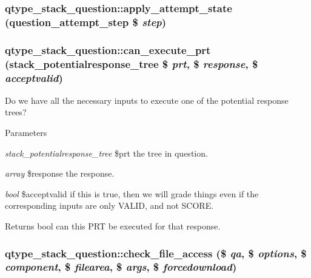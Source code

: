\hypertarget{classqtype__stack__question_a41ebd81c094de17a8cc9deaef4d06fcc}{
\subsubsection[{apply\_\-attempt\_\-state}]{\setlength{\rightskip}{0pt plus 5cm}qtype\_\-stack\_\-question::apply\_\-attempt\_\-state (question\_\-attempt\_\-step \$ {\em step})}}
\label{classqtype__stack__question_a41ebd81c094de17a8cc9deaef4d06fcc}
\hypertarget{classqtype__stack__question_aa0e6d5dfc0b67b125ea00e52d138f7c0}{
\subsubsection[{can\_\-execute\_\-prt}]{\setlength{\rightskip}{0pt plus 5cm}qtype\_\-stack\_\-question::can\_\-execute\_\-prt (stack\_\-potentialresponse\_\-tree \$ {\em prt}, \/  \$ {\em response}, \/  \$ {\em acceptvalid})}}
\label{classqtype__stack__question_aa0e6d5dfc0b67b125ea00e52d138f7c0}
Do we have all the necessary inputs to execute one of the potential response trees? 
\begin{DoxyParams}{Parameters}
\item[{\em stack\_\-potentialresponse\_\-tree}]\$prt the tree in question. \item[{\em array}]\$response the response. \item[{\em bool}]\$acceptvalid if this is true, then we will grade things even if the corresponding inputs are only VALID, and not SCORE. \end{DoxyParams}
\begin{DoxyReturn}{Returns}
bool can this PRT be executed for that response. 
\end{DoxyReturn}
\hypertarget{classqtype__stack__question_a5e40ef30933689b56c1d4a0f00f9190f}{
\subsubsection[{check\_\-file\_\-access}]{\setlength{\rightskip}{0pt plus 5cm}qtype\_\-stack\_\-question::check\_\-file\_\-access (\$ {\em qa}, \/  \$ {\em options}, \/  \$ {\em component}, \/  \$ {\em filearea}, \/  \$ {\em args}, \/  \$ {\em forcedownload})}}
